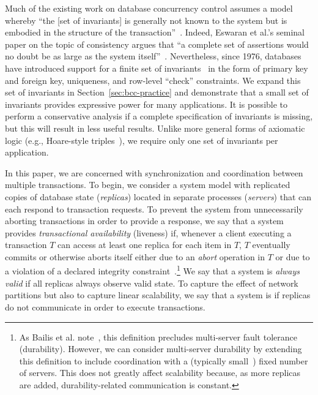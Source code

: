  Much of the existing work on
database concurrency control assumes a model whereby ``the [set of
  invariants] is generally not known to the system but is embodied in
the structure of the transaction''~\cite{traiger-tods}. Indeed,
Eswaran et al.'s seminal paper on the topic of consistency argues that
``a complete set of assertions would no doubt be as large as the
system itself''~\cite{eswaran-consistency}. Nevertheless, since 1976,
databases have introduced support for a finite set of
invariants~\cite{korth-serializability} in the form of primary key and
foreign key, uniqueness, and row-level ``check'' constraints. We
expand this set of invariants in Section~\ref{sec:bcc-practice} and
demonstrate that a small set of invariants provides expressive power
for many applications. It is possible to perform a conservative
analysis if a complete specification of invariants is missing, but
this will result in less useful results. Unlike more general forms of
axiomatic logic (e.g., Hoare-style triples~\cite{decomp-semantics}),
we require only one set of invariants per application.\vspace{.5em}

 In this paper, we are concerned with
synchronization and coordination between multiple transactions. To
begin, we consider a system model with replicated copies of database
state (\textit{replicas}) located in separate processes
(\textit{servers}) that can each respond to transaction requests.  To
prevent the system from unnecessarily aborting transactions in order
to provide a response, we say that a system provides
\textit{transactional availability} (liveness) if, whenever a client
executing a transaction $T$ can access at least one replica for each
item in $T$, $T$ eventually commits or otherwise aborts itself either
due to an \textit{abort} operation in $T$ or due to a violation of a
declared integrity constraint~\cite{hat-vldb}.\footnote{As Bailis et
  al. note~\cite{hat-vldb}, this definition precludes multi-server
  fault tolerance (durability). However, we can consider multi-server
  durability by extending this definition to include coordination with
  a (typically small~\cite{bigtable,spanner,dynamo}) fixed number of
  servers. This does not greatly affect scalability because, as more
  replicas are added, durability-related communication is constant.}
We say that a system is \textit{always valid} if all replicas always
observe valid state. To capture the effect of network partitions but
also to capture linear scalability, we say that a system is
\textit{\cfree} if replicas do not communicate in order to execute
transactions.

